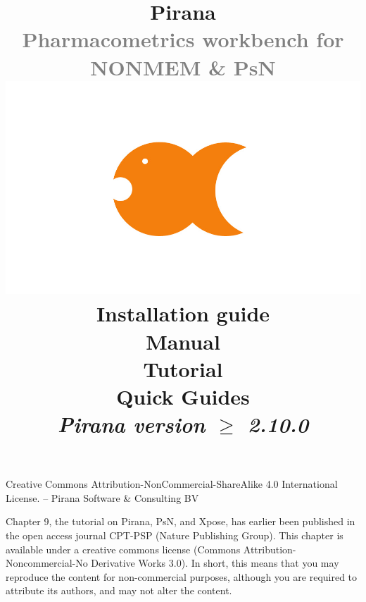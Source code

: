 \documentclass[9pt]{report}
\begin{document}
\title{
  \vspace{-100pt}
  \textbf{
  \textcolor{PiranaOrange}{\Large Pirana}
  }\\
  \vspace{5pt}
  \small \textcolor{Grey}{Pharmacometrics workbench for NONMEM \& PsN} \\
  \normalsize
  \vspace{15pt}
  \hspace{15pt}\includegraphics[scale=0.2]{images/pirana_logo.jpg}\\
  \vspace{15pt}
  \small Installation guide\\Manual\\Tutorial\\Quick Guides\\
  \vspace{8pt}  \textit{Pirana version $\geq$ 2.10.0}\\
  \vspace{8pt}
  \date{}
}

\maketitle

\null\vfill
\noindent

\vspace{5pt}

\small
\noindent Creative Commons Attribution-NonCommercial-ShareAlike 4.0 International License. -- Pirana Software \& Consulting BV\\

\vspace{5pt}

\noindent Chapter 9, the tutorial on Pirana, PsN, and Xpose, has
earlier been published in the open access journal CPT-PSP (Nature
Publishing Group).  This chapter is available under a creative commons
license (Commons Attribution-Noncommercial-No Derivative Works
3.0). In short, this means that you may reproduce the content for
non-commercial purposes, although you are required to attribute its
authors, and may not alter the content.
\end{document}
